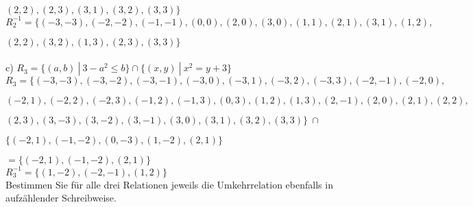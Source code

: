 \hspace{1.3cm}$(2,2), (2,3), (3,1), (3,2), (3,3)\}$\\

$R_{2}^{-1} = \{(-3,-3), (-2,-2), (-1,-1), (0,0), (2,0), (3,0), (1,1), (2,1), (3,1), (1,2),$

\hspace{1.5cm}$(2,2), (3,2), (1,3), (2,3), (3,3)\}$\\~\\

c) $R_3 = \{(a,b) \ | \  3 - a^2 \leq b\} \cap \{(x,y) \ | \ x^2 = y + 3 \}$\\

$R_3 = \{(-3,-3), (-3,-2), (-3,-1), (-3,0), (-3,1), (-3,2), (-3,3), (-2,-1), (-2,0),$

\hspace{1.3cm}$(-2,1), (-2,2), (-2,3), (-1,2), (-1,3), (0,3), (1,2), (1,3), (2,-1), (2,0), (2,1), (2,2),$

\hspace{1.3cm}$(2,3), (3,-3), (3,-2), (3,-1), (3,0), (3,1), (3,2), (3,3)\} \ \cap$

\hspace{1.05cm}$\{(-2,1), (-1,-2), (0,-3), (1,-2), (2,1)\}$

\hspace{0.63cm}$ = \{(-2,1), (-1,-2), (2,1)\}$\\

$R_{3}^{-1} = \{(1,-2), (-2,-1), (1,2)\}$\\

Bestimmen Sie für alle drei Relationen jeweils die Umkehrrelation ebenfalls in aufzählender Schreibweise.

\newpage